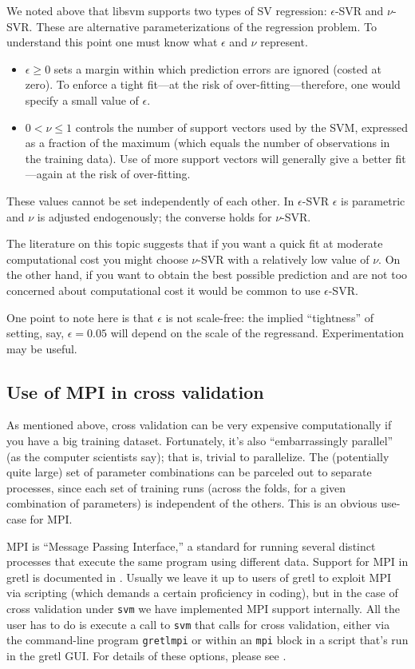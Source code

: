 \documentclass{article}
\begin{document}
We noted above that libsvm supports two types of SV regression:
$\epsilon$-SVR and $\nu$-SVR. These are alternative parameterizations
of the regression problem. To understand this point one must know what
$\epsilon$ and $\nu$ represent.
\begin{itemize}
\item $\epsilon \geq 0$ sets a margin within which prediction errors
  are ignored (costed at zero). To enforce a tight fit---at the risk
  of over-fitting---therefore, one would specify a small value of
  $\epsilon$.
\item $0 < \nu \leq 1$ controls the number of support vectors used by
  the SVM, expressed as a fraction of the maximum (which equals the
  number of observations in the training data). Use of more support
  vectors will generally give a better fit---again at the risk of
  over-fitting.
\end{itemize}
These values cannot be set independently of each other. In
$\epsilon$-SVR $\epsilon$ is parametric and $\nu$ is adjusted
endogenously; the converse holds for $\nu$-SVR.

The literature on this topic suggests that if you want a quick fit at
moderate computational cost you might choose $\nu$-SVR with a
relatively low value of $\nu$. On the other hand, if you want to
obtain the best possible prediction and are not too concerned about
computational cost it would be common to use $\epsilon$-SVR.

One point to note here is that $\epsilon$ is not scale-free: the
implied ``tightness'' of setting, say, $\epsilon = 0.05$ will depend
on the scale of the regressand. Experimentation may be useful.

\subsection{Use of MPI in cross validation}
\label{sec:mpi}

As mentioned above, cross validation can be very expensive
computationally if you have a big training dataset. Fortunately, it's
also ``embarrassingly parallel'' (as the computer scientists say);
that is, trivial to parallelize. The (potentially quite large) set of
parameter combinations can be parceled out to separate processes,
since each set of training runs (across the folds, for a given
combination of parameters) is independent of the others. This is an
obvious use-case for MPI.

MPI is ``Message Passing Interface,'' a standard for running several
distinct processes that execute the same program using different
data. Support for MPI in gretl is documented in
\cite{gretl-mpi}. Usually we leave it up to users of gretl to exploit
MPI via scripting (which demands a certain proficiency in coding), but
in the case of cross validation under \texttt{svm} we have implemented
MPI support internally. All the user has to do is execute a call to
\texttt{svm} that calls for cross validation, either via the
command-line program \texttt{gretlmpi} or within an \texttt{mpi} block
in a script that's run in the gretl GUI. For details of these options,
please see \cite{gretl-mpi}.
\end{document}
